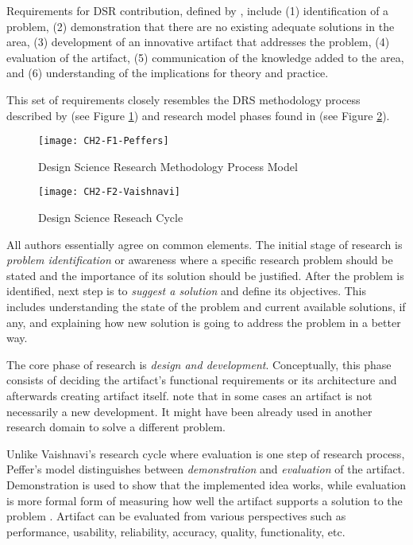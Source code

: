 Requirements for DSR contribution, defined by \citet{March2008}, include (1)
identification of a problem, (2) demonstration that there are no existing
adequate solutions in the area, (3) development of an innovative artifact that
addresses the problem, (4) evaluation of the artifact, (5) communication of the
knowledge added to the area, and (6) understanding of the implications for
theory and practice.

This set of requirements closely resembles the DRS methodology process described
by \citet{Peffers2008} (see Figure \ref{fig:peffers}) and research model phases
found in \citet{Vaishnavi2007} (see Figure \ref{fig:vaishnavi}).

\begin{figure}[h!]
\centering
\texttt{[image: CH2-F1-Peffers]}
\caption[Design Science Research Methodology Process Model]{Design Science
Research Methodology Process Model \citep{Peffers2008}}
\label{fig:peffers}
\end{figure}

\FloatBarrier

\begin{figure}[htp]
\centering
\texttt{[image: CH2-F2-Vaishnavi]}
\caption[Design Science Reseach Cycle]{Design Science Reseach Cycle
\citep{Vaishnavi2007}}
\label{fig:vaishnavi}
\end{figure}

All authors essentially agree on common elements. The initial stage of research
is \textit{problem identification} or awareness where a specific research
problem should be stated and the importance of its solution should be justified.
After the problem is identified, next step is to \textit{suggest a solution} and
define its objectives. This includes understanding the state of the problem and
current available solutions, if any, and explaining how new solution is going to
address the problem in a better way. 

\FloatBarrier

The core phase of research is \textit{design and development}. Conceptually,
this phase consists of deciding the artifact's functional requirements or its
architecture and afterwards creating artifact itself. \citet{Peffers2008} note
that in some cases an artifact is not necessarily a new development. It might
have been already used in another research domain to solve a different problem.

Unlike Vaishnavi's research cycle where evaluation is one step of research
process, Peffer's model distinguishes between \textit{demonstration} and
\textit{evaluation} of the artifact. Demonstration is used to show that the
implemented idea works, while evaluation is more formal form of measuring how
well the artifact supports a solution to the problem \citep{Peffers2008}.
Artifact can be evaluated from various perspectives such as performance,
usability, reliability, accuracy, quality, functionality, etc.

